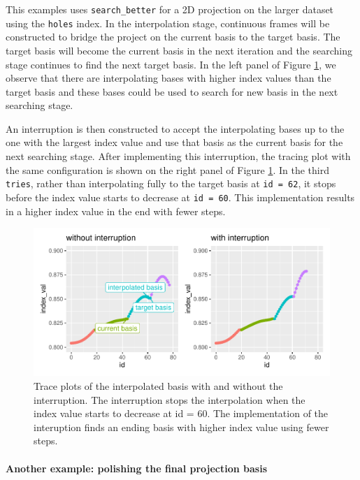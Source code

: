 \documentclass[12pt]{article}
\begin{document}
This examples uses \texttt{search\_better} for a 2D projection on the
larger dataset using the \texttt{holes} index. In the interpolation
stage, continuous frames will be constructed to bridge the project on
the current basis to the target basis. The target basis will become the
current basis in the next iteration and the searching stage continues to
find the next target basis. In the left panel of Figure
\ref{interruption}, we observe that there are interpolating bases with
higher index values than the target basis and these bases could be used
to search for new basis in the next searching stage.

An interruption is then constructed to accept the interpolating bases up
to the one with the largest index value and use that basis as the
current basis for the next searching stage. After implementing this
interruption, the tracing plot with the same configuration is shown on
the right panel of Figure \ref{interruption}. In the third
\texttt{tries}, rather than interpolating fully to the target basis at
\texttt{id\ =\ 62}, it stops before the index value starts to decrease
at \texttt{id\ =\ 60}. This implementation results in a higher index
value in the end with fewer steps.

\begin{figure}
\centering
\includegraphics{paper_files/figure-latex/interruption-1.pdf}
\caption{\label{interruption}Trace plots of the interpolated basis with
and without the interruption. The interruption stops the interpolation
when the index value starts to decrease at id = 60. The implementation
of the interuption finds an ending basis with higher index value using
fewer steps.}
\end{figure}

\hypertarget{another-example-polishing-the-final-projection-basis}{%
\paragraph{Another example: polishing the final projection
basis}\label{another-example-polishing-the-final-projection-basis}}
\end{document}
